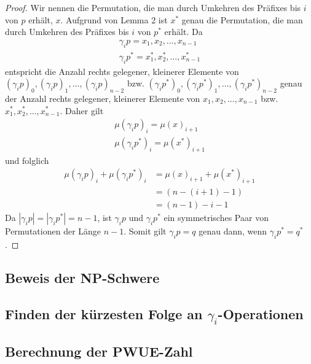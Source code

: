 \documentclass[a4paper, 10pt, ngerman]{article}
\begin{document}
\begin{proof}
    Wir nennen die Permutation, die man durch Umkehren des Präfixes bis $i$ von $p$ erhält, $x$. Aufgrund von Lemma 2 ist $x^*$ genau die Permutation, die man durch Umkehren des Präfixes bis $i$ von $p^*$ erhält.
    Da
    \begin{align*}
        \gamma_i p = x_1, x_2, \dots, x_{n-1} \\
        \gamma_i p^* = x^*_1, x^*_2, \dots, x^*_{n-1}
    \end{align*}
    entspricht die Anzahl rechts gelegener, kleinerer Elemente von $(\gamma_i p)_0, (\gamma_i p)_1, \dots, (\gamma_i p)_{n - 2}$ bzw. $(\gamma_i p^*)_0, (\gamma_i p^*)_1, \dots, (\gamma_i p^*)_{n - 2}$ genau der Anzahl rechts gelegener, kleinerer Elemente von $x_1, x_2, \dots, x_{n-1}$ bzw. $x^*_1, x^*_2, \dots, x^*_{n-1}$. Daher gilt
    \begin{align*}
        \mu(\gamma_i p)_i = \mu(x)_{i + 1} \\
        \mu(\gamma_i p^*)_i = \mu(x^*)_{i + 1}
    \end{align*}
    und folglich
    \begin{align*}
        \mu(\gamma_i p)_i + \mu(\gamma_i p^*)_i & = \mu(x)_{i + 1} + \mu(x^*)_{i + 1} \\
                                                & = (n - (i + 1) - 1)                 \\
                                                & = (n - 1) - i - 1
    \end{align*}
    Da $|\gamma_i p| = |\gamma_i p^*| = n - 1$, ist $\gamma_i p$ und $\gamma_i p^*$ ein symmetrisches Paar von Permutationen der Länge $n - 1$. Somit gilt $\gamma_i p = q$ genau dann, wenn $\gamma_i p^* = q^*$.
\end{proof}

\subsection{Beweis der NP-Schwere}

\subsection{Finden der kürzesten Folge an $\gamma_i$-Operationen}

\subsection{Berechnung der PWUE-Zahl}
\end{document}
